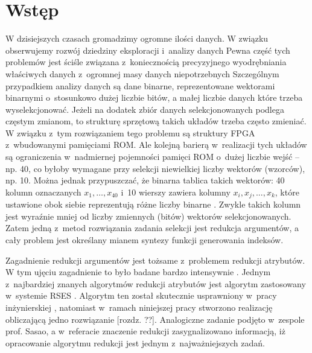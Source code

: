 \chapter{Wstęp}

W dzisiejszych czasach gromadzimy ogromne ilości danych.
W związku obserwujemy rozwój dziedziny eksploracji i~analizy danych
Pewna część tych problemów jest ściśle związana z~koniecznością precyzyjnego wyodrębniania właściwych danych z~ogromnej masy danych niepotrzebnych
Szczególnym przypadkiem analizy danych są dane binarne, reprezentowane wektorami binarnymi o~stosunkowo dużej liczbie bitów,
a małej liczbie danych które trzeba wyselekcjonować.
Jeżeli na dodatek zbiór danych selekcjonowanych podlega częstym zmianom,
to strukturę sprzętową takich układów trzeba często zmieniać.
W związku z~tym rozwiązaniem tego problemu są struktury FPGA z~wbudowanymi pamięciami ROM.
Ale kolejną barierą w~realizacji tych układów są ograniczenia w~nadmiernej pojemności pamięci ROM o~dużej liczbie wejść – np. 40,
co byłoby wymagane przy selekcji niewielkiej liczby wektorów (wzorców), np. 10.
Można jednak przypuszczać, że binarna tablica takich wektorów: 40 kolumn oznaczanych $x_1,…,x_{40}$ i~10 wierszy zawiera kolumny $x_i, x_j, ..., x_k$,
które ustawione obok siebie reprezentują różne liczby binarne \cite{sasao-workshop}.
Zwykle takich kolumn jest wyraźnie mniej od liczby zmiennych (bitów) wektorów selekcjonowanych.
Zatem jedną z~metod rozwiązania zadania selekcji jest redukcja argumentów,
a cały problem jest określany mianem syntezy funkcji generowania indeksów.

Zagadnienie redukcji argumentów jest tożsame z~problemem redukcji atrybutów.
W tym ujęciu zagadnienie to było badane bardzo intensywnie \cite{fast-algorithm, efektywna-procedura, new-reduction, steinbach-posthoff, skowron-rauszer, slezak, novel-method}.
Jednym z~najbardziej znanych algorytmów redukcji atrybutów jest algorytm zastosowany w~systemie RSES \cite{rses}.
Algorytm ten został skutecznie usprawniony w~pracy inżynierskiej \cite{efektywna-procedura},
natomiast w~ramach niniejszej pracy stworzono realizację obliczającą jedno rozwiązanie [rozdz. ??].
Analogiczne zadanie podjęto w~zespole prof. Sasao,
a w~referacie \cite{sasao-workshop} znaczenie redukcji zasygnalizowano informacją,
iż opracowanie algorytmu redukcji jest jednym z~najważniejszych zadań.

